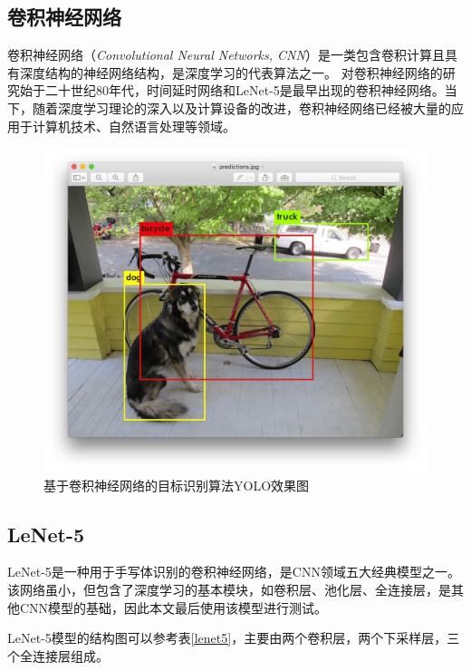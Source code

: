     \subsection{卷积神经网络}
    卷积神经网络（\emph{Convolutional Neural Networks, CNN}）是一类包含卷积计算且具有深度结构的神经网络结构，是深度学习的代表算法之一\cite{gu2018recent}。
    对卷积神经网络的研究始于二十世纪80年代，时间延时网络和LeNet-5是最早出现的卷积神经网络。当下，随着深度学习理论的深入以及计算设备的改进，卷积神经网络已经被大量的应用于计算机技术、自然语言处理等领域\cite{gu2018recent}。
    \begin{figure}[h]
        \centering
        \includegraphics[scale=0.2]{../pdf/yolo.png}
        \caption{基于卷积神经网络的目标识别算法YOLO效果图}
        \label{}
    \end{figure}
    \subsection{LeNet-5}
    LeNet-5是一种用于手写体识别的卷积神经网络，是CNN领域五大经典模型之一。该网络虽小，但包含了深度学习的基本模块，如卷积层、池化层、全连接层，是其他CNN模型的基础，因此本文最后使用该模型进行测试。

    LeNet-5模型的结构图可以参考表\ref{lenet5}，主要由两个卷积层，两个下采样层，三个全连接层组成。


